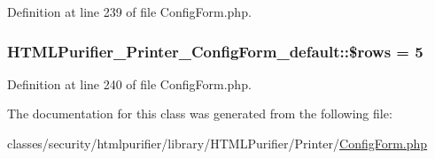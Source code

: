 Definition at line 239 of file Config\+Form.\+php.

\hypertarget{classHTMLPurifier__Printer__ConfigForm__default_ae249df38b0d9e27b2d7a0f67b91e1ba6}{
\subsubsection[{\$rows}]{\setlength{\rightskip}{0pt plus 5cm}H\+T\+M\+L\+Purifier\+\_\+\+Printer\+\_\+\+Config\+Form\+\_\+default\+::\$rows = 5}}\label{classHTMLPurifier__Printer__ConfigForm__default_ae249df38b0d9e27b2d7a0f67b91e1ba6}


Definition at line 240 of file Config\+Form.\+php.



The documentation for this class was generated from the following file\+:\begin{DoxyCompactItemize}
\item 
classes/security/htmlpurifier/library/\+H\+T\+M\+L\+Purifier/\+Printer/\hyperlink{ConfigForm_8php}{Config\+Form.\+php}\end{DoxyCompactItemize}

